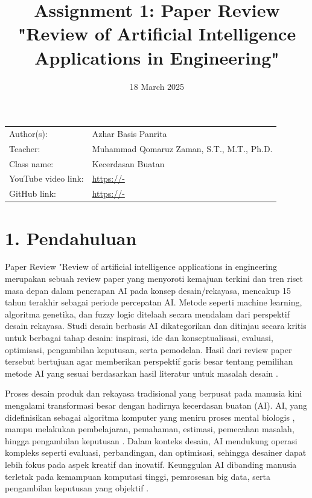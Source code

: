 \documentclass{article}
\title{Assignment 1: Paper Review "Review of Artificial Intelligence Applications in Engineering"
}
\date{18 March 2025}
\begin{document}
\maketitle


\noindent\begin{tabular}{@{}ll}
    Author(s): & Azhar Basis Panrita\\
     Teacher: &  Muhammad Qomaruz Zaman, S.T., M.T., Ph.D.\\
     Class name: & Kecerdasan Buatan\\
     YouTube video link: & \url{https://-} \\
     GitHub link: & \url{https://-}
\end{tabular}
\vspace{2cm}


\section*{1. Pendahuluan}
Paper Review "Review of artificial intelligence applications in engineering merupakan sebuah review paper yang menyoroti kemajuan terkini dan tren riset masa depan dalam penerapan AI pada konsep desain/rekayasa, mencakup 15 tahun terakhir sebagai periode percepatan AI. Metode seperti machine learning, algoritma genetika, dan fuzzy logic ditelaah secara mendalam dari perspektif desain rekayasa. Studi desain berbasis AI dikategorikan dan ditinjau secara kritis untuk berbagai tahap desain: inspirasi, ide dan konseptualisasi, evaluasi, optimisasi, pengambilan keputusan, serta pemodelan. Hasil dari review paper tersebut bertujuan agar memberikan perspektif garis besar tentang pemilihan metode AI yang sesuai berdasarkan hasil literatur untuk masalah desain \cite{yuksel2023}.

Proses desain produk dan rekayasa tradisional yang berpusat pada manusia kini mengalami transformasi besar dengan hadirnya kecerdasan buatan (AI). AI, yang didefinisikan sebagai algoritma komputer yang meniru proses mental biologis \cite{ertel2017} \cite{liu2018}, mampu melakukan pembelajaran, pemahaman, estimasi, pemecahan masalah, hingga pengambilan keputusan \cite{huang2019}. Dalam konteks desain, AI mendukung operasi kompleks seperti evaluasi, perbandingan, dan optimisasi, sehingga desainer dapat lebih fokus pada aspek kreatif dan inovatif. Keunggulan AI dibanding manusia terletak pada kemampuan komputasi tinggi, pemrosesan big data, serta pengambilan keputusan yang objektif \cite{liao2020} \cite{allison2022}.
\end{document}
